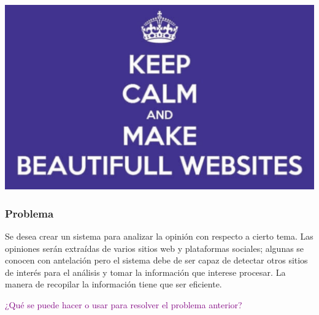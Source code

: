 \documentclass[
10pt, %
aspectratio=169, %
]{beamer}
\begin{document}
	{
		{%
			\includegraphics[width=\paperwidth,height=\paperheight]{meme1.png}
		}
		
		\begin{frame}
		\end{frame}
	}
	
	\begin{frame}
		
		\frametitle{Problema}
		
		Se desea crear un sistema para analizar la opinión con respecto a cierto tema. Las opiniones serán extraídas de varios sitios web y plataformas sociales; algunas se conocen con antelación pero el sistema debe de ser capaz de detectar otros sitios de interés para el análisis y tomar la información que interese procesar. La manera de recopilar la información tiene que ser eficiente. 
		
		\vspace{2\baselineskip}
		
		\textcolor{purple}{
			¿Qué se puede hacer o usar para resolver el problema anterior?
		}
		
		\vspace{3\baselineskip}
		
		
	\end{frame}
		
\end{document}
